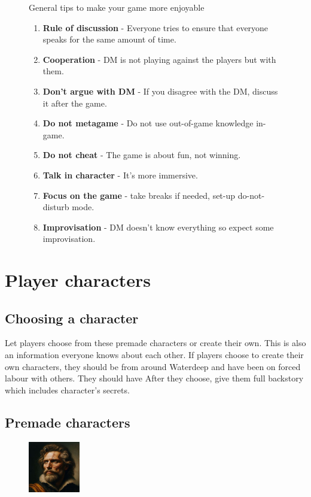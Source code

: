 \documentclass[10pt,onecolumn,twoside,openany,bg=full,layout=true]{dndbook}
\begin{document}
\begin{figure}
\begin{DndComment}{General tips to make your game more enjoyable}
  \begin{enumerate}
    \item \textbf{Rule of discussion} - Everyone tries to ensure that everyone speaks for the same amount of time.
    \item \textbf{Cooperation} - DM is not playing against the players but with them.
    \item \textbf{Don't argue with DM} - If you disagree with the DM, discuss it after the game.
    \item \textbf{Do not metagame} - Do not use out-of-game knowledge in-game.
    \item \textbf{Do not cheat} - The game is about fun, not winning.
    \item \textbf{Talk in character} - It's more immersive.
    \item \textbf{Focus on the game} - take breaks if needed, set-up do-not-disturb mode.
    \item \textbf{Improvisation} - DM doesn't know everything so expect some improvisation.
  \end{enumerate}
  \end{DndComment}
\end{figure}
\vfill
\pagebreak

\onecolumn
\chapter{Player characters}\label{ch:player-characters}
\section{Choosing a character}\label{sec:choosing-a-character}
Let players choose from these premade characters or create their own.
This is also an information everyone knows about each other.
If players choose to create their own characters, they should be from around Waterdeep and have been on forced labour with others.
They should have
After they choose, give them full backstory which includes character's secrets.

\vfill

\section{Premade characters}\label{sec:premade-characters}
  \begin{figure}
    \begin{center}
      \includegraphics[width=0.2\textwidth]{img/harold}
    \end{center}
  \end{figure}
\end{document}
